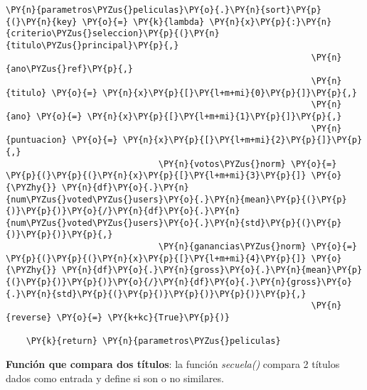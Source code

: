 \begin{tcolorbox}[breakable, size=fbox, boxrule=1pt, pad at break*=1mm,colback=cellbackground, colframe=cellborder]
\begin{Verbatim}[commandchars=\\\{\}]
    \PY{n}{parametros\PYZus{}peliculas}\PY{o}{.}\PY{n}{sort}\PY{p}{(}\PY{n}{key} \PY{o}{=} \PY{k}{lambda} \PY{n}{x}\PY{p}{:}\PY{n}{criterio\PYZus{}seleccion}\PY{p}{(}\PY{n}{titulo\PYZus{}principal}\PY{p}{,}
                                                            \PY{n}{ano\PYZus{}ref}\PY{p}{,} 
                                                            \PY{n}{titulo} \PY{o}{=} \PY{n}{x}\PY{p}{[}\PY{l+m+mi}{0}\PY{p}{]}\PY{p}{,} 
                                                            \PY{n}{ano} \PY{o}{=} \PY{n}{x}\PY{p}{[}\PY{l+m+mi}{1}\PY{p}{]}\PY{p}{,}
                                                            \PY{n}{puntuacion} \PY{o}{=} \PY{n}{x}\PY{p}{[}\PY{l+m+mi}{2}\PY{p}{]}\PY{p}{,}
                              \PY{n}{votos\PYZus{}norm} \PY{o}{=} \PY{p}{(}\PY{p}{(}\PY{n}{x}\PY{p}{[}\PY{l+m+mi}{3}\PY{p}{]} \PY{o}{\PYZhy{}} \PY{n}{df}\PY{o}{.}\PY{n}{num\PYZus{}voted\PYZus{}users}\PY{o}{.}\PY{n}{mean}\PY{p}{(}\PY{p}{)}\PY{p}{)}\PY{o}{/}\PY{n}{df}\PY{o}{.}\PY{n}{num\PYZus{}voted\PYZus{}users}\PY{o}{.}\PY{n}{std}\PY{p}{(}\PY{p}{)}\PY{p}{)}\PY{p}{,}
                              \PY{n}{ganancias\PYZus{}norm} \PY{o}{=} \PY{p}{(}\PY{p}{(}\PY{n}{x}\PY{p}{[}\PY{l+m+mi}{4}\PY{p}{]} \PY{o}{\PYZhy{}} \PY{n}{df}\PY{o}{.}\PY{n}{gross}\PY{o}{.}\PY{n}{mean}\PY{p}{(}\PY{p}{)}\PY{p}{)}\PY{o}{/}\PY{n}{df}\PY{o}{.}\PY{n}{gross}\PY{o}{.}\PY{n}{std}\PY{p}{(}\PY{p}{)}\PY{p}{)}\PY{p}{)}\PY{p}{,}
                                                            \PY{n}{reverse} \PY{o}{=} \PY{k+kc}{True}\PY{p}{)}
    
    \PY{k}{return} \PY{n}{parametros\PYZus{}peliculas} 
\end{Verbatim}
\end{tcolorbox}

    \textbf{Función que compara dos títulos}: la función \emph{secuela()}
compara 2 títulos dados como entrada y define si son o no similares.

